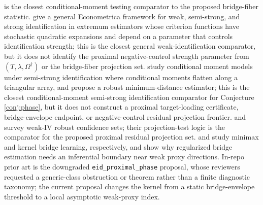 \documentclass[11pt]{article}
\theoremstyle{definition}
\theoremstyle{plain}
\theoremstyle{remark}
\begin{document}
is the closest conditional-moment testing comparator to the proposed
bridge-fiber statistic.
\cite[Section 2]{AndrewsCheng2012} give a general Econometrica framework for
weak, semi-strong, and strong identification in extremum estimators whose
criterion functions have stochastic quadratic expansions and depend on a
parameter that controls identification strength; this is the closest general
weak-identification comparator, but it does not identify the proximal
negative-control strength parameter from $(T,\lambda,\Omega^\dagger)$ or the
bridge-fiber projection set.
\cite[Sections 2--3]{AntoineLavergne2014} study conditional moment models
under semi-strong identification where conditional moments flatten along a
triangular array, and propose a robust minimum-distance estimator; this is the
closest conditional-moment semi-strong identification comparator for
Conjecture \ref{conj:phase}, but it does not construct a proximal
target-loading certificate, bridge-envelope endpoint, or negative-control
residual projection frontier.
\cite{StockWrightYogo2002}
and \cite{AndrewsStockSun2019} survey weak-IV robust confidence sets; their
projection-test logic is the comparator for the proposed proximal residual
projection set.  \cite{KallusMaoUehara2021} and
\cite{MastouriZhuGultchinEtAl2021} study minimax and kernel bridge learning,
respectively, and show why regularized bridge estimation needs an inferential
boundary near weak proxy directions.  In-repo prior art is the downgraded
\texttt{eid\_proximal\_phase} proposal, whose reviewers requested a
generic-class obstruction or theorem rather than a finite diagnostic taxonomy;
the current proposal changes the kernel from a static bridge-envelope
threshold to a local asymptotic weak-proxy index.
\end{document}
